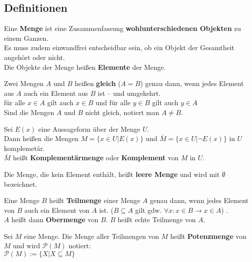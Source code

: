 \subsection*{Definitionen}

\begin{description}
  \setlength{\itemsep}{-.2cm}

  \item [Menge]
    Eine \textbf{Menge} ist eine Zusammenfassung 
    \textbf{wohlunterschiedenen Objekten} zu einem Ganzen.\\
    Es muss zudem einwandfrei entscheidbar sein, ob ein Objekt der Gesamtheit 
    angehört oder nicht.\\
    Die Objekte der Menge heißen \textbf{Elemente} der Menge.

  \item [gleichheit von Mengen:] 
    Zwei Mengen $A$ und $B$ heißen \textbf{gleich} ($A = B$) genau dann, wenn 
    jedes Element aus $A$ auch ein Element aus $B$ ist -- und umgekehrt.\\
    für alle $x \in A$ gilt auch $x \in B$ und für alle $y \in B$ gilt auch 
    $y \in A$ \\
    Sind die Mengen $A$ und $B$ nicht gleich, notiert man $A \neq B$.

  \item [Komplementärmenge:] 
    Sei $E(x)$ eine Aussageform über der Menge $U$.\\
    Dann heißen die Mengen 
    $M = \{x \in U | E(x)\}$ und $\bar{M} = \{x \in U | \neg E(x)\}$ in $U$ 
    komplemetär.\\
    $\bar{M}$ heißt \textbf{Komplementärmenge} oder \textbf{Komplement} von 
    $M$ in $U$.

  \item [Leere Menge:] 
    Die Menge, die kein Element enthält, heißt \textbf{leere Menge} und wird mit 
    $\emptyset$ bezeichnet.

  \item [Teilmenge:] 
    Eine Menge $B$ heißt \textbf{Teilmenge} einer Menge $A$ genau dann, wenn 
    jedes Element von $B$ auch ein Element von $A$ ist. ($B \subseteq A$ gilt 
    gdw. $\forall x : x \in B \rightarrow x \in A$) .\\
    $A$ heißt dann \textbf{Obermenge} von $B$. $B$ heißt echte Teilmenge von $A$.

  \item [Potenzmenge:] 
    Sei $M$ eine Menge. Die Menge aller Teilmengen von $M$ heißt 
    \textbf{Potenzmenge} von $M$ und wird $\mathcal{P}(M)$ notiert: \\
    $\mathcal{P}(M) := \{X | X \subseteq M\}$


\end{description}
